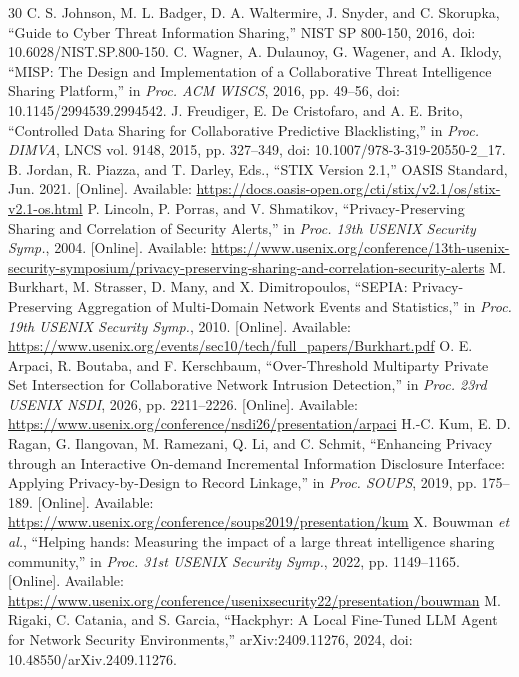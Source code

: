 \documentclass[conference,letterpaper]{IEEEtran}
\begin{document}
\begin{thebibliography}{30}
 C. S. Johnson, M. L. Badger, D. A. Waltermire, J. Snyder, and C. Skorupka, ``Guide to Cyber Threat Information Sharing,'' NIST SP 800-150, 2016, doi: 10.6028/NIST.SP.800-150.
 C. Wagner, A. Dulaunoy, G. Wagener, and A. Iklody, ``MISP: The Design and Implementation of a Collaborative Threat Intelligence Sharing Platform,'' in \emph{Proc. ACM WISCS}, 2016, pp. 49--56, doi: 10.1145/2994539.2994542.
 J. Freudiger, E. De Cristofaro, and A. E. Brito, ``Controlled Data Sharing for Collaborative Predictive Blacklisting,'' in \emph{Proc. DIMVA}, LNCS vol. 9148, 2015, pp. 327--349, doi: 10.1007/978-3-319-20550-2\_17.
 B. Jordan, R. Piazza, and T. Darley, Eds., ``STIX Version 2.1,'' OASIS Standard, Jun. 2021. [Online]. Available: \url{https://docs.oasis-open.org/cti/stix/v2.1/os/stix-v2.1-os.html}
 P. Lincoln, P. Porras, and V. Shmatikov, ``Privacy-Preserving Sharing and Correlation of Security Alerts,'' in \emph{Proc. 13th USENIX Security Symp.}, 2004. [Online]. Available: \url{https://www.usenix.org/conference/13th-usenix-security-symposium/privacy-preserving-sharing-and-correlation-security-alerts}
 M. Burkhart, M. Strasser, D. Many, and X. Dimitropoulos, ``SEPIA: Privacy-Preserving Aggregation of Multi-Domain Network Events and Statistics,'' in \emph{Proc. 19th USENIX Security Symp.}, 2010. [Online]. Available: \url{https://www.usenix.org/events/sec10/tech/full_papers/Burkhart.pdf}
 O. E. Arpaci, R. Boutaba, and F. Kerschbaum, ``Over-Threshold Multiparty Private Set Intersection for Collaborative Network Intrusion Detection,'' in \emph{Proc. 23rd USENIX NSDI}, 2026, pp. 2211--2226. [Online]. Available: \url{https://www.usenix.org/conference/nsdi26/presentation/arpaci}
 H.-C. Kum, E. D. Ragan, G. Ilangovan, M. Ramezani, Q. Li, and C. Schmit, ``Enhancing Privacy through an Interactive On-demand Incremental Information Disclosure Interface: Applying Privacy-by-Design to Record Linkage,'' in \emph{Proc. SOUPS}, 2019, pp. 175--189. [Online]. Available: \url{https://www.usenix.org/conference/soups2019/presentation/kum}
 X. Bouwman \emph{et al.}, ``Helping hands: Measuring the impact of a large threat intelligence sharing community,'' in \emph{Proc. 31st USENIX Security Symp.}, 2022, pp. 1149--1165. [Online]. Available: \url{https://www.usenix.org/conference/usenixsecurity22/presentation/bouwman}
 M. Rigaki, C. Catania, and S. Garcia, ``Hackphyr: A Local Fine-Tuned LLM Agent for Network Security Environments,'' arXiv:2409.11276, 2024, doi: 10.48550/arXiv.2409.11276.

\end{thebibliography}
\end{document}
